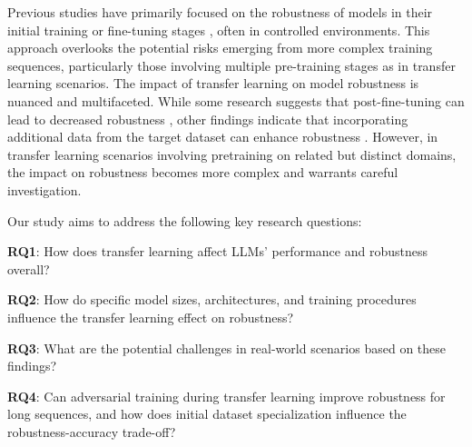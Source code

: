 \documentclass{article}
\begin{document}
Previous studies have primarily focused on the robustness of models in their initial training or fine-tuning stages \cite{schwinn2023adversarial} \cite{yang2024assessing} \cite{bueno2024}, often in controlled environments. This approach overlooks the potential risks emerging from more complex training sequences, particularly those involving multiple pre-training stages as in transfer learning scenarios. The impact of transfer learning on model robustness is nuanced and multifaceted. While some research suggests that post-fine-tuning can lead to decreased robustness \cite{yang2024assessing}, other findings indicate that incorporating additional data from the target dataset can enhance robustness \cite{xiong2024all}. However, in transfer learning scenarios involving pretraining on related but distinct domains, the impact on robustness becomes more complex and warrants careful investigation.

Our study aims to address the following key research questions:

\textbf{RQ1}: How does transfer learning affect LLMs' performance and robustness overall?

\textbf{RQ2}: How do specific model sizes, architectures, and training procedures influence the transfer learning effect on robustness?

\textbf{RQ3}: What are the potential challenges in real-world scenarios based on these findings?

\textbf{RQ4}: Can adversarial training during transfer learning improve robustness for long sequences, and how does initial dataset specialization influence the robustness-accuracy trade-off?


\end{document}
